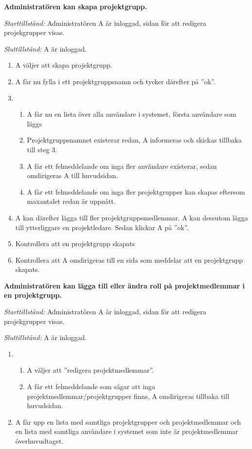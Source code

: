\documentclass[a4paper]{article}
\begin{document}
\begin{ST}

\item
\textbf{Administratören kan skapa projektgrupp.}

\emph{Starttillstånd:} Administratören A är inloggad, sidan för att redigera projekgrupper visas.

\emph{Sluttillstånd:} A är inloggad.

\begin{enumerate}
\item A väljer att skapa projektgrupp.
\item A får nu fylla i ett projektgruppsnamn och tycker därefter på ''ok''.
\item 
\begin{enumerate}
\item A får nu en lista över alla användare i systemet, första användare som läggs %
\item Projektgruppsnamnet existerar redan, A informeras och skickas tillbaka till steg 3.
\item A får ett felmeddelande om inga fler användare existerar, sedan omdirigeras A till huvudsidan.
\item A får ett felmeddelande om inga fler projektgrupper kan skapas eftersom maxantalet redan är uppnått.
\end{enumerate}
\item A kan därefter lägga till fler projektgruppsmedlemmar. A kan dessutom lägga till ytterliggare en projektledare. Sedan klickar A på ''ok''.
\item Kontrollera att en projektgrupp skapats
\item Kontrollera att A omdirigeras till en sida som meddelar att en projektgrupp skapats.
\end{enumerate}

\item
\textbf{Administratören kan lägga till eller ändra roll på projektmedlemmar i en projektgrupp.}

\emph{Starttillstånd:} Administratören A är inloggad, sidan för att redigera projekgrupper visas.

\emph{Sluttillstånd:} A är inloggad.

\begin{enumerate}
\item 
\begin{enumerate}
\item A väljer att ''redigera projektmedlemmar''.
\item A får ett felmeddelande som sägar att inga projektmedlemmar/projektgrupper finns, A omdirigeras tillbaka till huvudsidan.
\end{enumerate}
\item A får upp en lista med samtliga projektgrupper och projektmedlemmar och en lista med samtliga användare i systemet som inte är projektmedlemmar överhuvudtaget.


\end{enumerate}
\end{ST}
\end{document}
